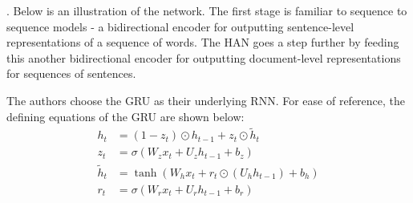 \documentclass[11pt]{article}
\begin{document}
\myspace
\p {}. Below is an illustration of the network. The first stage is familiar to sequence to sequence models - a bidirectional encoder for outputting sentence-level representations of a sequence of words. The HAN goes a step further by feeding this another bidirectional encoder for outputting document-level representations for sequences of sentences. 


The authors choose the GRU as their underlying RNN. For ease of reference, the defining equations of the GRU are shown below:
\begin{align}
h_t &= (1 - z_t) \odot h_{t - 1} + z_t \odot \tilde h_t \\
z_t &= \sigma \left( W_z x_t + U_z h_{t - 1} + b_z \right) \\
\tilde h_t &= \tanh \left( W_h x_t + r_t \odot (U_h h_{t - 1}) + b_h \right) \\
r_t &= \sigma \left( W_r x_t + U_r h_{t - 1} + b_r \right)
\end{align}
\end{document}
